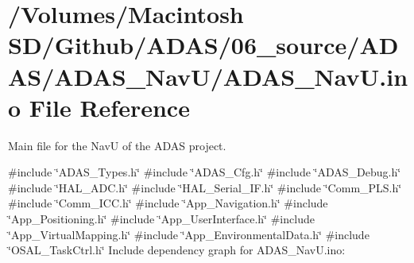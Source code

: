 \hypertarget{_a_d_a_s___nav_u_8ino}{}\section{/\+Volumes/\+Macintosh S\+D/\+Github/\+A\+D\+A\+S/06\+\_\+source/\+A\+D\+A\+S/\+A\+D\+A\+S\+\_\+\+Nav\+U/\+A\+D\+A\+S\+\_\+\+NavU.ino File Reference}
\label{_a_d_a_s___nav_u_8ino}


Main file for the NavU of the A\+D\+AS project.  


{\ttfamily \#include \char`\"{}A\+D\+A\+S\+\_\+\+Types.\+h\char`\"{}}\newline
{\ttfamily \#include \char`\"{}A\+D\+A\+S\+\_\+\+Cfg.\+h\char`\"{}}\newline
{\ttfamily \#include \char`\"{}A\+D\+A\+S\+\_\+\+Debug.\+h\char`\"{}}\newline
{\ttfamily \#include \char`\"{}H\+A\+L\+\_\+\+A\+D\+C.\+h\char`\"{}}\newline
{\ttfamily \#include \char`\"{}H\+A\+L\+\_\+\+Serial\+\_\+\+I\+F.\+h\char`\"{}}\newline
{\ttfamily \#include \char`\"{}Comm\+\_\+\+P\+L\+S.\+h\char`\"{}}\newline
{\ttfamily \#include \char`\"{}Comm\+\_\+\+I\+C\+C.\+h\char`\"{}}\newline
{\ttfamily \#include \char`\"{}App\+\_\+\+Navigation.\+h\char`\"{}}\newline
{\ttfamily \#include \char`\"{}App\+\_\+\+Positioning.\+h\char`\"{}}\newline
{\ttfamily \#include \char`\"{}App\+\_\+\+User\+Interface.\+h\char`\"{}}\newline
{\ttfamily \#include \char`\"{}App\+\_\+\+Virtual\+Mapping.\+h\char`\"{}}\newline
{\ttfamily \#include \char`\"{}App\+\_\+\+Environmental\+Data.\+h\char`\"{}}\newline
{\ttfamily \#include \char`\"{}O\+S\+A\+L\+\_\+\+Task\+Ctrl.\+h\char`\"{}}\newline
Include dependency graph for A\+D\+A\+S\+\_\+\+Nav\+U.\+ino\+:
